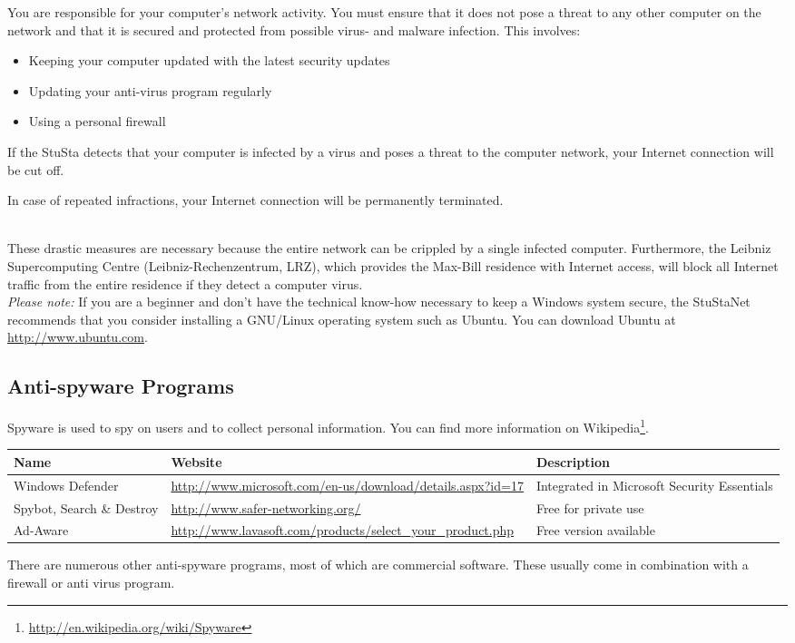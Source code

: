 \documentclass[a4paper,12pt]{scrartcl}
\begin{document}
You are responsible for your computer's network activity. You must ensure that it does not pose a threat to any other computer on the network and that it is secured and protected from possible virus- and malware infection. This involves:
\begin{itemize}
	\item Keeping your computer updated with the latest security updates
	\item Updating your anti-virus program regularly
	\item Using a personal firewall
\end{itemize}
If the StuSta detects that your computer is infected by a virus and poses a threat to the computer network, your Internet connection will be cut off.
\\
\begin{em}
	In case of repeated infractions, your Internet connection will be permanently terminated.
\end{em}
\\
These drastic measures are necessary because the entire network can be crippled by a single infected computer. Furthermore, the Leibniz Supercomputing Centre (Leibniz-Rechenzentrum, LRZ), which provides the Max-Bill residence with Internet access, will block all Internet traffic from the entire residence if they detect a computer virus.
\\
\emph{Please note:} If you are a beginner and don't have the technical know-how necessary to keep a Windows system secure, the StuStaNet recommends that you consider installing a GNU/Linux operating system such as Ubuntu. You can download Ubuntu at \url{http://www.ubuntu.com}.

\subsection*{Anti-spyware Programs}

Spyware is used to spy on users and to collect personal information. You can find more information on Wikipedia\footnote{\url{http://en.wikipedia.org/wiki/Spyware}}.

\begin{center}
	\begin{tabularx}{\linewidth}{|p{.18\linewidth}Xp{.3\linewidth}|}
		\hline
		Name & Website & Description\\
		\hline \hline
		Windows Defender & \url{http://www.microsoft.com/en-us/download/details.aspx?id=17} & Integrated in Microsoft Security Essentials\\
		\hline
		Spybot, Search \& Destroy & \url{http://www.safer-networking.org/} & Free for private use\\
		\hline
		Ad-Aware & \url{http://www.lavasoft.com/products/select\_your\_product.php} & Free version available\\
		\hline
	\end{tabularx}
\end{center}
There are numerous other anti-spyware programs, most of which are commercial software. These usually come in combination with a firewall or anti virus program.
\end{document}
